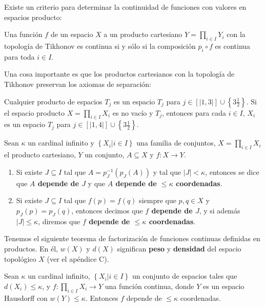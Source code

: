 \documentclass[12pt]{report}
\theoremstyle{largebreak}
\newcommand\abs[1]{\ensuremath{\lvert#1\rvert}}
\newcommand{\cf}[3]{\ensuremath{#1:#2\rightarrow#3}}
\newcommand{\natint}[1]{\ensuremath{\left[|#1|\right]}}
\begin{document}
    Existe un criterio para determinar la continuidad de funciones con valores en espacios producto:

    \begin{theor}
        Una función $f$ de un espacio $X$ a un producto cartesiano $Y=\prod_{i\in I}Y_i$ con la topología de Tikhonov es continua si y sólo si la composición $p_i\circ f$ es continua para toda $i\in I$.
    \end{theor}

    Una cosa importante es que los productos cartesianos con la topología de Tikhonov preservan los axiomas de separación:

    \begin{theor}
        Cualquier producto de espacios $T_j$ es un espacio $T_j$ para $j\in\natint{1,3}\cup\left\{3\frac{1}{2} \right\}$. Si el espacio producto $X=\prod_{i\in I}X_i$ es no vacío y $T_j$, entonces para cada $i\in I$, $X_i$ es un espacio $T_j$ para $j\in\natint{1,4}\cup\left\{3\frac{1}{2} \right\}$.
    \end{theor}

    \begin{mydef}
        Sean $\kappa$ un cardinal infinito y $\left\{X_i\big| i\in I \right\}$ una familia de conjuntos, $X=\prod_{i\in I}X_i$ el producto cartesiano, $Y$ un conjunto, $A\subseteq X$ y $\cf{f}{X}{Y}$.
        \begin{enumerate}
            \item Si existe $J\subseteq I$ tal que $A=p_J^{-1}(p_J(A))$ y tal que $\abs{J}<\kappa$, entonces se dice que \textbf{$A$ depende de $J$} y que \textbf{$A$ depende de $\leq\kappa$ coordenadas}.
            \item Si existe $J\subseteq I$ tal que $f(p)=f(q)$ siempre que $p,q\in X$ y $p_J(p)=p_J(q)$, entonces decimos que \textbf{$f$ depende de $J$}, y si además $\abs{J}\leq\kappa$, diremos que \textbf{$f$ depende de $\leq\kappa$ coordenadas}.
        \end{enumerate}
    \end{mydef}

    Tenemos el siguiente teorema de factorización de funciones continuas definidas en productos. En él, $w(X)$ y $d(X)$ significan \textbf{peso} y \textbf{densidad} del espacio topológico $X$ (ver el apéndice C).

    \begin{theor}
        Sean $\kappa$ un cardinal infinito, $\left\{X_i\big| i\in I \right\}$ un conjunto de espacios tales que $d(X_i)\leq\kappa$, y $\cf{f}{\prod_{i\in I}X_i}{Y}$ una función continua, donde $Y$ es un espacio Hausdorff con $w(Y)\leq\kappa$. Entonces $f$ depende de $\leq\kappa$ coordenadas.
    \end{theor}
\end{document}
